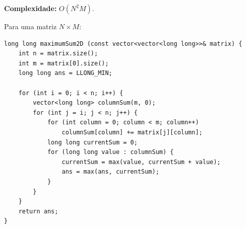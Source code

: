 \textbf{Complexidade:} $O(N^2M)$.

Para uma matriz $N\times M$:

\begin{lstlisting}
long long maximumSum2D (const vector<vector<long long>>& matrix) {
    int n = matrix.size();
    int m = matrix[0].size();
    long long ans = LLONG_MIN;

    for (int i = 0; i < n; i++) {
        vector<long long> columnSum(m, 0);
        for (int j = i; j < n; j++) {
            for (int column = 0; column < m; column++)
                columnSum[column] += matrix[j][column];
            long long currentSum = 0;
            for (long long value : columnSum) {
                currentSum = max(value, currentSum + value);
                ans = max(ans, currentSum);
            }
        }
    }
    return ans;
}
\end{lstlisting}